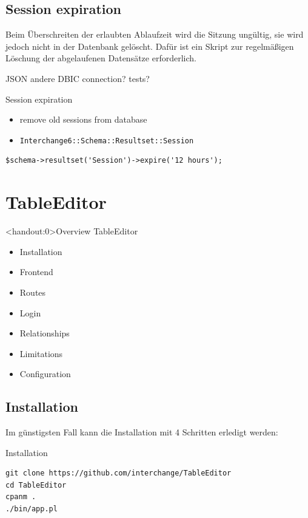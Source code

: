 \subsection{Session expiration}

Beim Überschreiten der erlaubten Ablaufzeit wird die Sitzung
ungültig, sie wird jedoch nicht in der Datenbank gelöscht.
Dafür ist ein Skript zur regelmäßigen Löschung der
abgelaufenen Datensätze erforderlich.

JSON
andere DBIC connection?
tests?

\begin{frame}[fragile]{Session expiration}
\begin{itemize}
\item remove old sessions from database
\item \verb|Interchange6::Schema::Resultset::Session|
\end{itemize}
\begin{lstlisting}
$schema->resultset('Session')->expire('12 hours');
\end{lstlisting}
\end{frame}

\section{TableEditor}

\begin{frame}<handout:0>{Overview TableEditor}
\begin{itemize}
\item Installation
\item Frontend
\item Routes
\item Login
\item Relationships
\item Limitations
\item Configuration
\end{itemize}
\end{frame}

\subsection{Installation}
Im günstigsten Fall kann die Installation mit 4 Schritten
erledigt werden:

\begin{frame}[fragile]{Installation}
\begin{lstlisting}
git clone https://github.com/interchange/TableEditor
cd TableEditor
cpanm .
./bin/app.pl
\end{lstlisting}
\end{frame}


